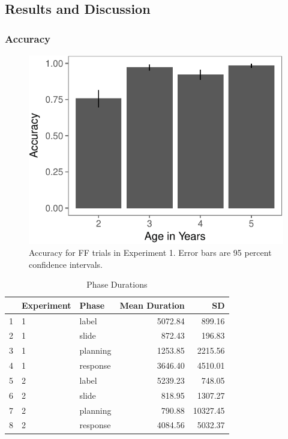 \documentclass[a4paper,man,apacite,floatsintext]{apa6}
\newenvironment{CodeChunk}{}{}
\begin{document}
\subsection{Results and Discussion}\label{results-and-discussion}

\subsubsection{Accuracy}\label{accuracy}

\begin{CodeChunk}
\begin{figure}[b]

{\centering \includegraphics{figs/acc_e1-1} 

}

\caption[Accuracy for FF trials in Experiment 1]{Accuracy for FF trials in Experiment 1. Error bars are 95 percent confidence intervals.}\label{fig:acc_e1}
\end{figure}
\end{CodeChunk}

\begin{table}[b]
\centering
\begin{tabular}{rllrr}
  \hline
 & Experiment & Phase & Mean Duration & SD \\ 
  \hline
1 & 1 & label & 5072.84 & 899.16 \\ 
  2 & 1 & slide & 872.43 & 196.83 \\ 
  3 & 1 & planning & 1253.85 & 2215.56 \\ 
  4 & 1 & response & 3646.40 & 4510.01 \\ 
   \hline
5 & 2 & label & 5239.23 & 748.05 \\ 
  6 & 2 & slide & 818.95 & 1307.27 \\ 
  7 & 2 & planning & 790.88 & 10327.45 \\ 
  8 & 2 & response & 4084.56 & 5032.37 \\ 
   \hline
\end{tabular}
\caption{Phase Durations} 
\label{tab:phases}
\end{table}
\end{document}
